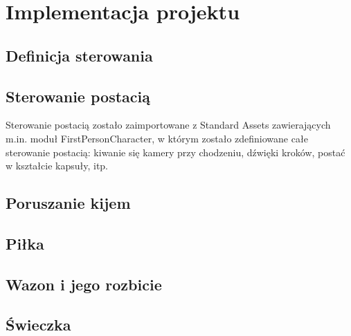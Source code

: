 \section{Implementacja projektu}

\subsection{Definicja sterowania}

\subsection{Sterowanie postacią}
Sterowanie postacią zostało zaimportowane z Standard Assets zawierających m.in. moduł FirstPersonCharacter, w którym zostało zdefiniowane całe sterowanie postacią: kiwanie się kamery przy chodzeniu, dźwięki kroków, postać w kształcie kapsuły, itp.

\subsection{Poruszanie kijem}

\subsection{Piłka}

\subsection{Wazon i jego rozbicie}

\subsection{Świeczka}


